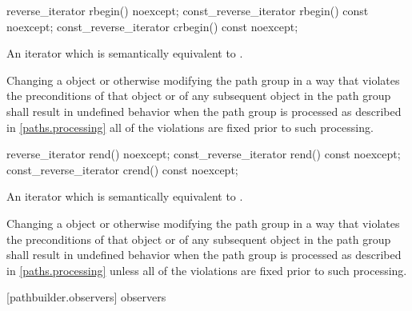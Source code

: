 \begin{itemdecl}
	reverse_iterator rbegin() noexcept;
	const_reverse_iterator rbegin() const noexcept;
	const_reverse_iterator crbegin() const noexcept;
\end{itemdecl}
\begin{itemdescr}
	\pnum
	\returns
	An iterator which is semantically equivalent to .
	
	\pnum
	\remarks
	Changing a  object or otherwise modifying the path group in a way that violates the preconditions of that  object or of any subsequent  object in the path group shall result in undefined behavior when the path group is processed as described in \ref{paths.processing} all of the violations are fixed prior to such processing.
\end{itemdescr}

\begin{itemdecl}
	reverse_iterator rend() noexcept;
	const_reverse_iterator rend() const noexcept;
	const_reverse_iterator crend() const noexcept;
\end{itemdecl}
\begin{itemdescr}
	\pnum
	\returns
	An iterator which is semantically equivalent to .
	
	\pnum
	\remarks
	Changing a  object or otherwise modifying the path group in a way that violates the preconditions of that  object or of any subsequent  object in the path group shall result in undefined behavior when the path group is processed as described in \ref{paths.processing} unless all of the violations are fixed prior to such processing.
\end{itemdescr}

 [pathbuilder.observers] { observers}

